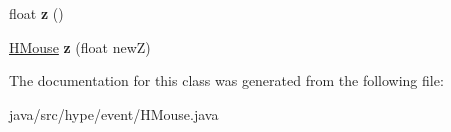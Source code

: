 \begin{DoxyCompactItemize}
\item 
\hypertarget{classhype_1_1event_1_1_h_mouse_a169daaced368f192805d39527c457685}{float {\bfseries z} ()}\label{classhype_1_1event_1_1_h_mouse_a169daaced368f192805d39527c457685}

\item 
\hypertarget{classhype_1_1event_1_1_h_mouse_af9d6afdcbccdf0fcb958b02950acc37c}{\hyperlink{classhype_1_1event_1_1_h_mouse}{H\-Mouse} {\bfseries z} (float new\-Z)}\label{classhype_1_1event_1_1_h_mouse_af9d6afdcbccdf0fcb958b02950acc37c}

\end{DoxyCompactItemize}


The documentation for this class was generated from the following file\-:\begin{DoxyCompactItemize}
\item 
java/src/hype/event/H\-Mouse.\-java\end{DoxyCompactItemize}
